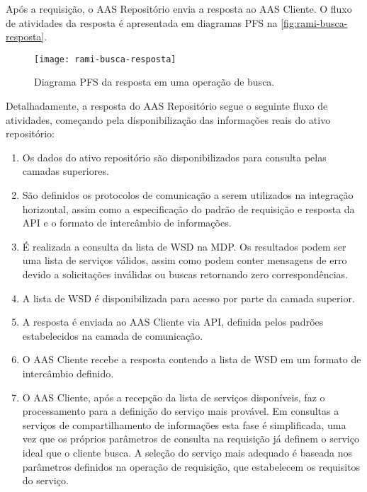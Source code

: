 	Após a requisição, o AAS Repositório envia a resposta ao AAS Cliente. O fluxo de atividades da resposta é apresentada em diagramas PFS na \autoref{fig:rami-busca-resposta}.

	\begin{figure}[htb]
		\centering
		\caption{Diagrama PFS da resposta em uma operação de busca.}
		\label{fig:rami-busca-resposta}
		\texttt{[image: rami-busca-resposta]}
	\end{figure}

	Detalhadamente, a resposta do AAS Repositório segue o seguinte fluxo de atividades, começando pela disponibilização das informações reais do ativo repositório:
	
	\begin{enumerate}
		\item Os dados do ativo repositório são disponibilizados para consulta pelas camadas superiores.
		
		\item São definidos os protocolos de comunicação a serem utilizados na integração horizontal, assim como a especificação do padrão de requisição e resposta da API e o formato de intercâmbio de informações.
		
		\item É realizada a consulta da lista de WSD na MDP. Os resultados podem ser uma lista de serviços válidos, assim como podem conter mensagens de erro devido a solicitações inválidas ou buscas retornando zero correspondências.
		
		\item A lista de WSD é disponibilizada para acesso por parte da camada superior.

		\item A resposta é enviada ao AAS Cliente via API, definida pelos padrões estabelecidos na camada de comunicação.
		
		\item O AAS Cliente recebe a resposta contendo a lista de WSD em um formato de intercâmbio definido.
		
		\item O AAS Cliente, após a recepção da lista de serviços disponíveis, faz o processamento para a definição do serviço mais provável. Em consultas a serviços de compartilhamento de informações esta fase é simplificada, uma vez que os próprios parâmetros de consulta na requisição já definem o serviço ideal que o cliente busca. A seleção do serviço mais adequado é baseada nos parâmetros definidos na operação de requisição, que estabelecem os requisitos do serviço.
		
	\end{enumerate}

